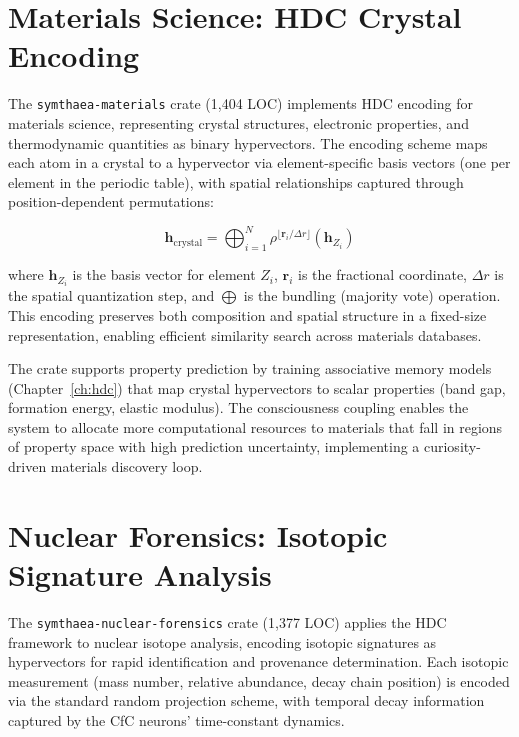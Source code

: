 \documentclass[12pt]{book}
\begin{document}
\section{Materials Science: HDC Crystal Encoding}

The \texttt{symthaea-materials} crate (1,404 LOC) implements HDC encoding for materials science, representing crystal structures, electronic properties, and thermodynamic quantities as binary hypervectors. The encoding scheme maps each atom in a crystal to a hypervector via element-specific basis vectors (one per element in the periodic table), with spatial relationships captured through position-dependent permutations:

\begin{equation}
\mathbf{h}_{\text{crystal}} = \bigoplus_{i=1}^{N} \rho^{\lfloor \mathbf{r}_i / \Delta r \rfloor}(\mathbf{h}_{Z_i})
\end{equation}

\noindent where $\mathbf{h}_{Z_i}$ is the basis vector for element $Z_i$, $\mathbf{r}_i$ is the fractional coordinate, $\Delta r$ is the spatial quantization step, and $\bigoplus$ is the bundling (majority vote) operation. This encoding preserves both composition and spatial structure in a fixed-size representation, enabling efficient similarity search across materials databases.

The crate supports property prediction by training associative memory models (Chapter~\ref{ch:hdc}) that map crystal hypervectors to scalar properties (band gap, formation energy, elastic modulus). The consciousness coupling enables the system to allocate more computational resources to materials that fall in regions of property space with high prediction uncertainty, implementing a curiosity-driven materials discovery loop.

\section{Nuclear Forensics: Isotopic Signature Analysis}

The \texttt{symthaea-nuclear-forensics} crate (1,377 LOC) applies the HDC framework to nuclear isotope analysis, encoding isotopic signatures as hypervectors for rapid identification and provenance determination. Each isotopic measurement (mass number, relative abundance, decay chain position) is encoded via the standard random projection scheme, with temporal decay information captured by the CfC neurons' time-constant dynamics.
\end{document}
